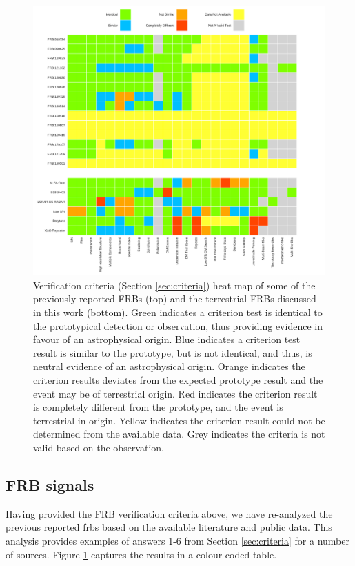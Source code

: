 \documentclass[a4paper,fleqn,usenatbib]{mnras}
\begin{document}
\begin{figure}
    \includegraphics[width=1.0\linewidth]{verification/FRBheatmap.pdf}
    \caption{Verification criteria (Section \ref{sec:criteria}) heat map of some
    of the previously reported FRBs (top) and the terrestrial FRBs discussed in
    this work (bottom).  Green indicates a criterion test is identical to the
    prototypical detection or observation, thus providing evidence in favour of
    an astrophysical origin.  Blue indicates a criterion test result is similar
    to the prototype, but is not identical, and thus, is neutral evidence of an
    astrophysical origin.  Orange indicates the criterion results deviates from
    the expected prototype result and the event may be of terrestrial origin.
    Red indicates the criterion result is completely different from the
    prototype, and the event is terrestrial in origin. Yellow indicates the
    criterion result could not be determined from the available data.  Grey
    indicates the criteria is not valid based on the observation.
    }
    \label{fig:heat_map}
\end{figure}

\subsection{FRB signals}

Having provided the FRB verification criteria above, we have re-analyzed the
previous reported \glspl{frb} based on the available literature and public data.
This analysis provides examples of answers 1-6 from Section \ref{sec:criteria}
for a number of sources. Figure \ref{fig:heat_map} captures the results in a
colour coded table. 
\end{document}
